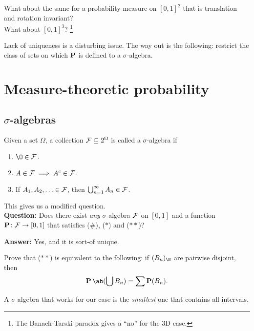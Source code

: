 What about the same for a probability measure on $[0, 1]^2$ that is
translation and rotation invariant? \\
What about $[0, 1]^3$?%
\footnote{The Banach-Tarski paradox gives a ``no'' for the 3D case.}

Lack of uniqueness is a disturbing issue.
The way out is the following: restrict the class of sets on which $\P$ is
defined to a $\sigma$-algebra.

\chapter{Measure-theoretic probability} \label{chp:measure}

\section{$\sigma$-algebras} \label{sec:sigma}
\begin{definition*} \label{def:sigma}
    Given a set $\Omega$, a collection $\F \subseteq 2^\Omega$ is called a
    $\sigma$-algebra if
    \begin{enumerate}
        \item $\O \in \F$. \label{def:sigma:o}
        \item $A \in \F \implies A^c \in \F$. \label{def:sigma:c}
        \item If $A_1, A_2, \ldots \in \F$, then
            $\bigcup_{n=1}^\infty A_n \in \F$. \label{def:sigma:u}
    \end{enumerate}
\end{definition*}

This gives us a modified question. \\
\textbf{Question:} Does there exist \emph{any} $\sigma$-algebra $\F$ on
$[0, 1]$ and a function $\P\colon \F \to [0, 1]$ that satisfies
(\#), ($*$) and ($**$)?%

\textbf{Answer:} Yes, and it is sort-of unique.

\begin{exercise}
    Prove that ($**$) is equivalent to the following:
    if $(B_n)_\N$ are pairwise disjoint, then \[
        \P\ab(\bigcup B_n) = \sum \P(B_n).
    \]
\end{exercise}
\begin{solution}
\end{solution}

A $\sigma$-algebra that works for our case is the \emph{smallest}
one that contains all intervals.

